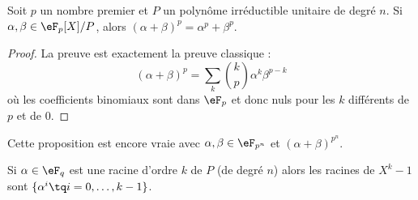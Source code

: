 \begin{lemma}       \label{LemZrUUOz}
    Soit \( p\) un nombre premier et \( P\) un polynôme irréductible unitaire de degré \( n\). Si \( \alpha,\beta\in \eF_p[X]/P\), alors \( (\alpha+\beta)^p=\alpha^p+\beta^p\).
\end{lemma}

\begin{proof}
    La preuve est exactement la preuve classique :
    \begin{equation}
        (\alpha+\beta)^p=\sum_k{k\choose p} \alpha^k\beta^{p-k}
    \end{equation}
    où les coefficients binomiaux sont dans \( \eF_p\) et donc nuls pour les \( k\) différents de \( p\) et de \( 0\).
\end{proof}
Cette proposition est encore vraie avec \( \alpha,\beta\in\eF_{p^n}\) et \( (\alpha+\beta)^{p^n}\).

\begin{lemma}
    Si \( \alpha\in \eF_q\) est une racine d'ordre \( k\) de \( P\) (de degré \( n\)) alors les racines de \( X^k-1\) sont \( \{ \alpha^i\tq i=0,\ldots, k-1 \}\).
\end{lemma}

